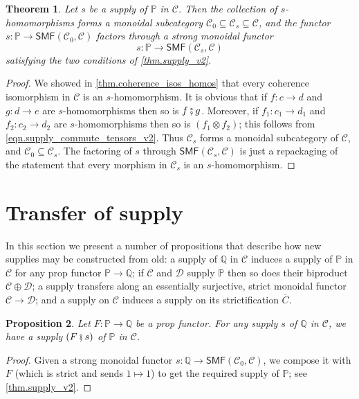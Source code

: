 \documentclass[11pt, oneside, article]{memoir}
\theoremstyle{plain}
\newtheorem{theorem}{Theorem}[chapter]
\newtheorem{proposition}[theorem]{Proposition}
\theoremstyle{definition}
\theoremstyle{remark}
\newcommand{\cat}[1]{\mathcal{#1}}%
\newcommand{\Cat}[1]{{\mathsf{#1}}}%
\newcommand{\strict}[1]{\overline{#1}}
\newcommand{\smf}{\Cat{SMF}}
\newcommand{\pp}{\mathbb{P}}
\newcommand{\qq}{\mathbb{Q}}
\newcommand{\mob}[1]{#1_0}
\newcommand{\cp}{\mathbin{\fatsemi}}
\renewcommand{\ss}{\subseteq}
\begin{document}
\begin{theorem}\label{thm.homos_form_subcat}
Let $s$ be a supply of $\pp$ in $\cat{C}$. Then the collection of $s$-homomorphisms forms a monoidal subcategory $\mob{\cat{C}}\ss\cat{C}_s\ss\cat{C}$, and the functor $s\colon\pp\to\smf(\mob{\cat{C}},\cat{C})$ factors through a strong monoidal functor
\[s\colon\pp\to\smf(\cat{C}_s,\cat{C})\]
satisfying the two conditions of \cref{thm.supply_v2}.
\end{theorem}
\begin{proof}
We showed in \cref{thm.coherence_isos_homos} that every coherence isomorphism in $\cat{C}$ is an $s$-homomorphism. It is obvious that if $f\colon c\to d$ and $g\colon d\to e$ are $s$-homomorphisms then so is $f\cp g$. Moreover, if $f_1\colon c_1\to d_1$ and $f_2\colon c_2\to d_2$ are $s$-homomorphisms then so is $(f_1\otimes f_2)$; this follows from \cref{eqn.supply_commute_tensors_v2}. Thus $\cat{C}_s$ forms a monoidal subcategory of $\cat{C}$, and $\mob{\cat{C}}\ss\cat{C}_s$. The factoring of $s$ through $\smf(\cat{C}_s,\cat{C})$ is just a repackaging of the statement that every morphism in $\cat{C}_s$ is an $s$-homomorphism. 
\end{proof}

\section{Transfer of supply}\label{sec.further_theory}

In this section we present a number of propositions that describe how new supplies may be constructed from old: a supply of $\qq$ in $\cat{C}$ induces a supply of $\pp$ in $\cat{C}$ for any prop functor $\pp \to \qq$; if $\cat{C}$ and $\cat{D}$ supply $\pp$ then so does their biproduct $\cat{C}\oplus\cat{D}$; a supply transfers along an essentially surjective, strict monoidal functor $\cat{C} \to \cat{D}$; and a supply on $\cat{C}$ induces a supply on its strictification $\strict{C}$.

\begin{proposition}\label{cor.change_of_supply}
Let $F\colon\pp\to\qq$ be a prop functor. For any supply $s$ of $\qq$ in $\cat{C}$, we have a supply $(F\cp s)$ of $\pp$ in $\cat{C}$.
\end{proposition}
\begin{proof}
Given a strong monoidal functor $s\colon\qq\to\smf(\mob{\cat{C}},\cat{C})$, we compose it with $F$ (which is strict and sends $1\mapsto 1$) to get the required supply of $\pp$; see \cref{thm.supply_v2}.
\end{proof}
\end{document}
